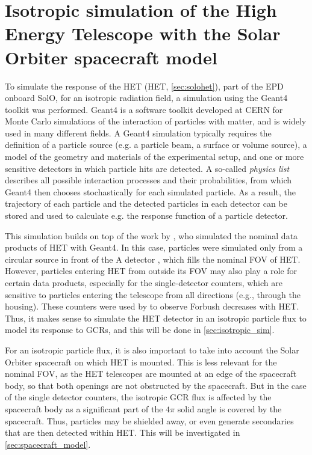\chapter{Isotropic simulation of the High Energy Telescope with the Solar Orbiter spacecraft model}
\label{chp:HETSimulation}

To simulate the response of the \acl{HET} (\acs{HET}, \autoref{sec:solohet}), part of the \acl{EPD} \citep[\acs{EPD},][]{RodriguezPacheco-2019-EPD} onboard \ac{SolO}, for an isotropic radiation field, a simulation using the \acl{Geant4} toolkit \citep[\acs{Geant4},][]{Agostinelli-2003} was performed. \ac{Geant4} is a software toolkit developed at CERN for Monte Carlo simulations of the interaction of particles with matter, and is widely used in many different fields. A \ac{Geant4} simulation typically requires the definition of a particle source (e.g. a particle beam, a surface or volume source), a model of the geometry and materials of the experimental setup, and one or more sensitive detectors in which particle hits are detected. A so-called \textit{physics list} describes all possible interaction processes and their probabilities, from which \ac{Geant4} then chooses stochastically for each simulated particle. As a result, the trajectory of each particle and the detected particles in each detector can be stored and used to calculate e.g. the response function of a particle detector.

This simulation builds on top of the work by \citet{Elftmann-2020-PhD}, who simulated the nominal data products of \ac{HET} with \ac{Geant4}. In this case, particles were simulated only from a circular source in front of the A detector \citep[see][Figure 5.1]{Elftmann-2020-PhD}, which fills the nominal \ac{FOV} of \ac{HET}. However, particles entering \ac{HET} from outside its \ac{FOV} may also play a role for certain data products, especially for the single-detector counters, which are sensitive to particles entering the telescope from all directions (e.g., through the housing). These counters were used by \citet{Forstner-2021-SolO} to observe Forbush decreases with \ac{HET}. Thus, it makes sense to simulate the \ac{HET} detector in an isotropic particle flux to model its response to \acp{GCR}, and this will be done in \autoref{sec:isotropic_sim}.

For an isotropic particle flux, it is also important to take into account the Solar Orbiter spacecraft on which \ac{HET} is mounted. This is less relevant for the nominal \ac{FOV}, as the \ac{HET} telescopes are mounted at an edge of the spacecraft body, so that both openings are not obstructed by the spacecraft. But in the case of the single detector counters, the isotropic \ac{GCR} flux is affected by the spacecraft body as a significant part of the $4\pi$ solid angle is covered by the spacecraft. Thus, particles may be shielded away, or even generate secondaries that are then detected within \ac{HET}. This will be investigated in \autoref{sec:spacecraft_model}.

